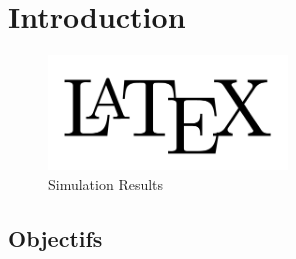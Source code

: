 \documentclass[journal]{IEEEtran}
\begin{document}
\section{Introduction}
\blindtext
\begin{figure}[h]
	\centering
	\includegraphics[width=2.5in]{logo}
	\caption{Simulation Results}
	\label{fig_sim}
\end{figure}
\subsection{Objectifs}
\blindtext


%
%

\end{document}
